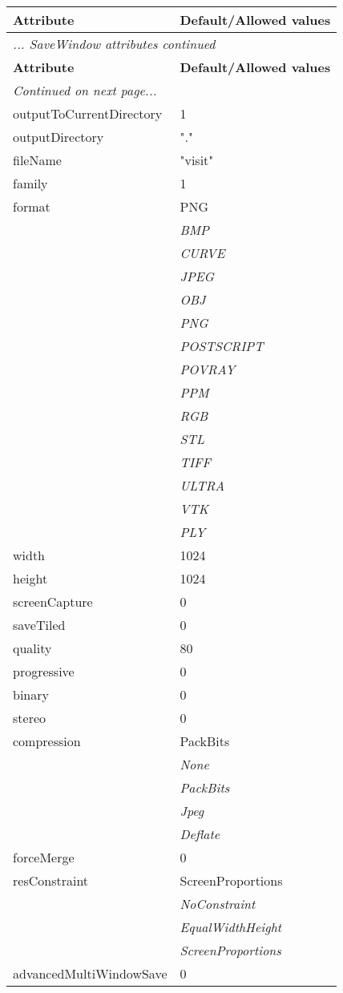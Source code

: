 \documentclass[10pt,a4paper]{report}
\begin{document}
\begin{longtable}{ll}
{\bf Attribute} & {\bf Default/Allowed values} \\
\hline \hline
\endfirsthead
\multicolumn{2}{l}{{\it ... SaveWindow attributes continued}} \\
{\bf Attribute} & {\bf Default/Allowed values} \\
\hline \hline
\endhead
\hline
\multicolumn{2}{l}{{\it Continued on next page...}} \\
\endfoot
\hline
\endlastfoot

outputToCurrentDirectory  &  1 \\
outputDirectory  &  "." \\
fileName  &  "visit" \\
family  &  1 \\
format  &  PNG   \\
 & {\it  BMP} \\
 & {\it  CURVE} \\
 & {\it  JPEG} \\
 & {\it  OBJ} \\
 & {\it  PNG} \\
 & {\it  POSTSCRIPT} \\
 & {\it  POVRAY} \\
 & {\it  PPM} \\
 & {\it  RGB} \\
 & {\it  STL} \\
 & {\it  TIFF} \\
 & {\it  ULTRA} \\
 & {\it  VTK} \\
 & {\it  PLY} \\
width  &  1024 \\
height  &  1024 \\
screenCapture  &  0 \\
saveTiled  &  0 \\
quality  &  80 \\
progressive  &  0 \\
binary  &  0 \\
stereo  &  0 \\
compression  &  PackBits   \\
 & {\it  None} \\
 & {\it  PackBits} \\
 & {\it  Jpeg} \\
 & {\it  Deflate} \\
forceMerge  &  0 \\
resConstraint  &  ScreenProportions   \\
 & {\it  NoConstraint} \\
 & {\it  EqualWidthHeight} \\
 & {\it  ScreenProportions} \\
advancedMultiWindowSave  &  0 \\
\end{longtable}
\end{document}
